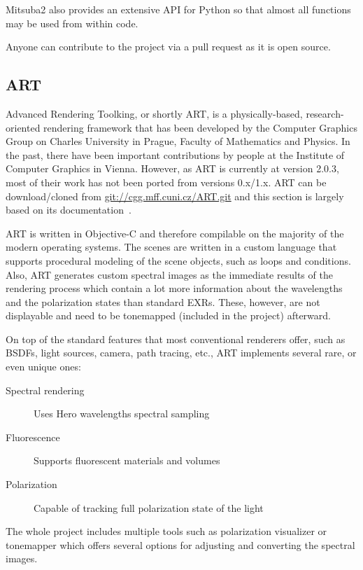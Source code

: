 Mitsuba2 also provides an extensive API for Python so that almost all functions may be used from within code. 

Anyone can contribute to the project via a pull request as it is open source.

\subsection{ART}

Advanced Rendering Toolking, or shortly ART, is a physically-based, research-oriented rendering framework that has been developed by the Computer Graphics Group on Charles University in Prague, Faculty of Mathematics and Physics. In the past, there have been important contributions by people at the Institute of Computer Graphics in Vienna. However, as ART is currently at version 2.0.3, most of their work has not been ported from versions 0.x/1.x. ART can be download/cloned from \url{git://cgg.mff.cuni.cz/ART.git} and this section is largely based on its documentation~\cite{artDoc}.

ART is written in Objective-C and therefore compilable on the majority of the modern operating systems. The scenes are written in a custom language that supports procedural modeling of the scene objects, such as loops and conditions. Also, ART generates custom spectral images as the immediate results of the rendering process which contain a lot more information about the wavelengths and the polarization states than standard EXRs. These, however, are not displayable and need to be tonemapped (included in the project) afterward.

On top of the standard features that most conventional renderers offer, such as BSDFs, light sources, camera, path tracing, etc., ART implements several rare, or even unique ones:

\begin{description}
	\item[Spectral rendering] Uses Hero wavelengths spectral sampling
	\item[Fluorescence] Supports fluorescent materials and volumes
	\item[Polarization] Capable of tracking full polarization state of the light
\end{description}

The whole project includes multiple tools such as polarization visualizer or tonemapper which offers several options for adjusting and converting the spectral images.

